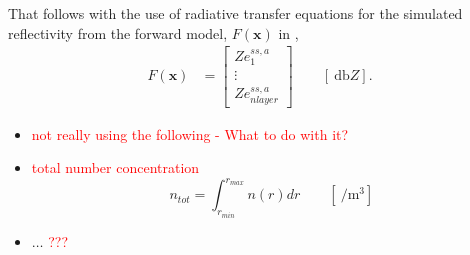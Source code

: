 That follows with the use of radiative transfer equations for the simulated reflectivity from the forward model, $F(\mathbf{x})$ in , 
\begin{align}
	F(\mathbf{x}) & = \begin{bmatrix} 
		Ze^{ss,a}_1 \\
		\vdots \\
		Ze^{ss,a}_{nlayer}
	\end{bmatrix} \qquad [\SI{}{\decibel Z}]. \label{eq:forward_model}
\end{align}


\begin{itemize}
	\item \textcolor{red}{not really using the following - What to do with it?}
	\item \textcolor{red}{total number concentration} \\
	$$n_{tot} = \int_{r_{min}}^{r_{max}} n(r) dr \qquad [\SI{}{\per\cubic\metre}]$$ 
	\item $\ldots$ \textcolor{red}{??? }
	
\end{itemize}






